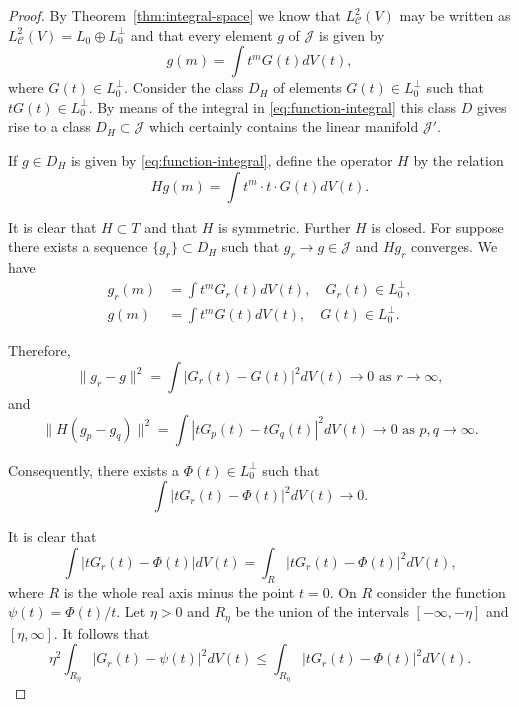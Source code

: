 \documentclass{article}
\begin{document}
\begin{proof}
By Theorem~\ref{thm:integral-space} we know that $L^2_\mathcal{C}(V)$ may be written as $L^2_\mathcal{C}(V) = L_0 \oplus L_0^{\perp}$ and that every element $g$ of $\mathcal{J}$ is given by
\begin{equation}
g(m) = \int t^m G(t) dV(t),
\label{eq:function-integral}
\end{equation}
where $G(t) \in L_0^{\perp}$. Consider the class $D_H$ of elements $G(t) \in L_0^{\perp}$ such that $tG(t) \in L_0^{\perp}$. By means of the integral in \eqref{eq:function-integral} this class $D$ gives rise to a class $D_H \subset \mathcal{J}$ which certainly contains the linear manifold $\mathcal{J}'$.

If $g \in D_H$ is given by \eqref{eq:function-integral}, define the operator $H$ by the relation
\begin{equation}
Hg(m) = \int t^m \cdot t \cdot G(t) dV(t).
\label{eq:operator-definition}
\end{equation}

It is clear that $H \subset T$ and that $H$ is symmetric. Further $H$ is closed. For suppose there exists a sequence $\{g_r\} \subset D_H$ such that $g_r \to g \in \mathcal{J}$ and $Hg_r$ converges. We have
\begin{align}
g_r(m) &= \int t^m G_r(t) dV(t), \quad G_r(t) \in L_0^{\perp}, \\
g(m) &= \int t^m G(t) dV(t), \quad G(t) \in L_0^{\perp}.
\label{eq:convergence-setup}
\end{align}

Therefore,
\begin{equation}
\|g_r - g\|^2 = \int |G_r(t) - G(t)|^2 dV(t) \to 0 \text{ as } r \to \infty,
\label{eq:norm-convergence}
\end{equation}
and
\begin{equation}
\|H(g_p - g_q)\|^2 = \int |t G_p(t) - t G_q(t)|^2 dV(t) \to 0 \text{ as } p, q \to \infty.
\label{eq:operator-convergence}
\end{equation}

Consequently, there exists a $\Phi(t) \in L_0^{\perp}$ such that
\begin{equation}
\int |t G_r(t) - \Phi(t)|^2 dV(t) \to 0.
\label{eq:limit-function}
\end{equation}

It is clear that
\begin{equation}
\int |t G_r(t) - \Phi(t)| dV(t) = \int_R |t G_r(t) - \Phi(t)|^2 dV(t),
\label{eq:integral-equality}
\end{equation}
where $R$ is the whole real axis minus the point $t = 0$. On $R$ consider the function $\psi(t) = \Phi(t)/t$. Let $\eta > 0$ and $R_\eta$ be the union of the intervals $[-\infty, -\eta]$ and $[\eta, \infty]$. It follows that
\begin{equation}
\eta^2 \int_{R_\eta} |G_r(t) - \psi(t)|^2 dV(t) \leq \int_{R_\eta} |t G_r(t) - \Phi(t)|^2 dV(t).
\label{eq:eta-bound}
\end{equation}


\end{proof}
\end{document}
